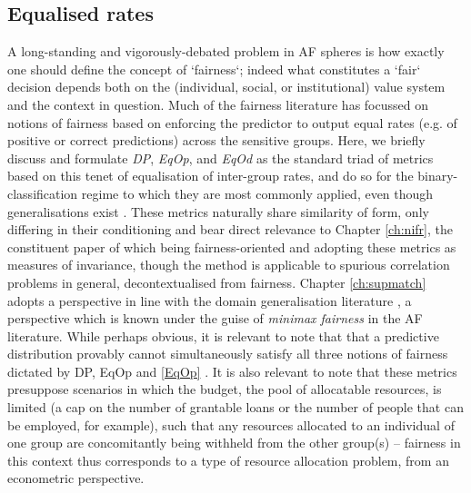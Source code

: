 \subsection{Equalised rates}\label{sec:equalised-rates}
%
A long-standing and vigorously-debated problem in \ac{AF} spheres is how exactly one should define
the concept of `fairness`; indeed what constitutes a `fair` decision depends both on the
(individual, social, or institutional) value system and the context in question.
%
Much of the fairness literature has focussed on notions of fairness based on enforcing the
predictor to output equal rates (e.g. of positive or correct predictions) across the sensitive
groups.
%
Here, we briefly discuss and formulate \emph{\acf{DP}}, \emph{\acf{EqOp}}, and \emph{\acf{EqOd}}
as the standard triad of metrics based on this tenet of equalisation of inter-group rates, and do
so for the binary-classification regime to which they are most commonly applied, even though
generalisations exist \citep{woodworth2017learning}. 
%
These metrics naturally share similarity of form, only differing in their conditioning and bear
direct relevance to Chapter \ref{ch:nifr}, the constituent paper of which being fairness-oriented
and adopting these metrics as measures of invariance, though the method is applicable to spurious
correlation problems in general, decontextualised from fairness.
%
Chapter \ref{ch:supmatch} adopts a perspective in line with the domain generalisation literature
\cite{sagawa2019distributionally}, a perspective which is known under the guise of \emph{minimax
fairness} in the \ac{AF} literature.
%
While perhaps obvious, it is relevant to note that that a predictive distribution provably cannot
simultaneously satisfy all three notions of fairness dictated by \ac{DP}, \ac{EqOp} and \ref{EqOp}
\citep{kleinberg2016inherent}.
%
It is also relevant to note that these metrics presuppose scenarios in which the budget, the pool
of allocatable resources, is limited (a cap on the number of grantable loans or the number of
people that can be employed, for example), such that any resources allocated to an individual of
one group are concomitantly being withheld from the other group(s) -- fairness in this context thus
corresponds to a type of resource allocation problem, from an econometric perspective.
%

